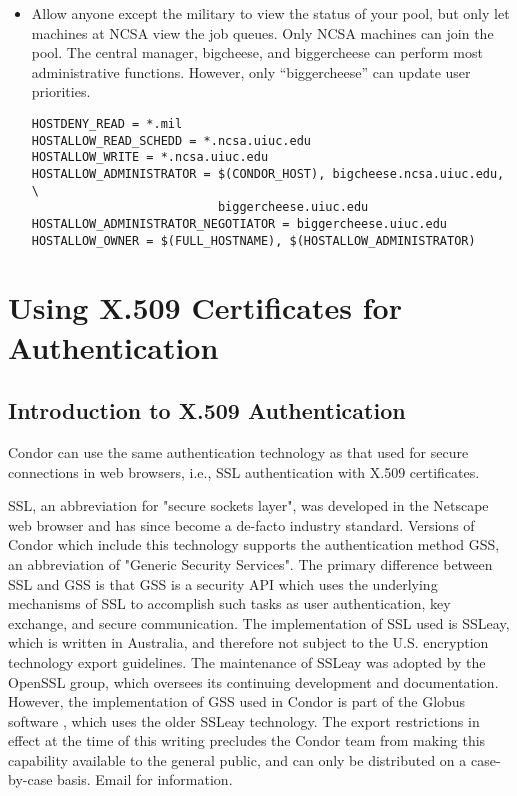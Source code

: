 \begin{itemize}
\item Allow anyone except the military to view the status of your
pool, but only let machines at NCSA view the job queues.  Only NCSA
machines can join the pool. The central manager, bigcheese, and
biggercheese can perform most administrative functions.  However, only
``biggercheese'' can update user priorities.
\begin{verbatim}
HOSTDENY_READ = *.mil
HOSTALLOW_READ_SCHEDD = *.ncsa.uiuc.edu 
HOSTALLOW_WRITE = *.ncsa.uiuc.edu
HOSTALLOW_ADMINISTRATOR = $(CONDOR_HOST), bigcheese.ncsa.uiuc.edu, \
                          biggercheese.uiuc.edu
HOSTALLOW_ADMINISTRATOR_NEGOTIATOR = biggercheese.uiuc.edu
HOSTALLOW_OWNER = $(FULL_HOSTNAME), $(HOSTALLOW_ADMINISTRATOR)
\end{verbatim}

\end{itemize}

\section{\label{sec:X509-Authentication}Using X.509 Certificates for
Authentication} 

\subsection{\label{sec:General-X509-Authentication}Introduction to X.509 
Authentication}

Condor can use the same authentication technology as that used for secure
connections in web browsers, i.e., SSL authentication with X.509 certificates.

SSL, an abbreviation for "secure sockets layer", was developed in the 
Netscape web browser and has since become a de-facto industry standard.
Versions of Condor which include this technology supports the authentication
method GSS, an abbreviation of "Generic Security Services". The
primary difference between SSL and GSS is that GSS is a security API which
uses the underlying mechanisms of SSL to accomplish such tasks as user
authentication, key exchange, and secure communication. The implementation
of SSL used is SSLeay, which is written in Australia, and therefore not
subject to the U.S. encryption technology export guidelines. The maintenance
of SSLeay was adopted by the OpenSSL group, which oversees its continuing
development and documentation. However, the implementation of GSS used in
Condor is part of the Globus software \Url{www.globus.org}, which uses the 
older SSLeay technology. The export restrictions in effect at the time of
this writing precludes the Condor team from making this capability available
to the general public, and can only be distributed on a case-by-case basis.
Email \Email{condor-admin@cs.wisc.edu} for information.

